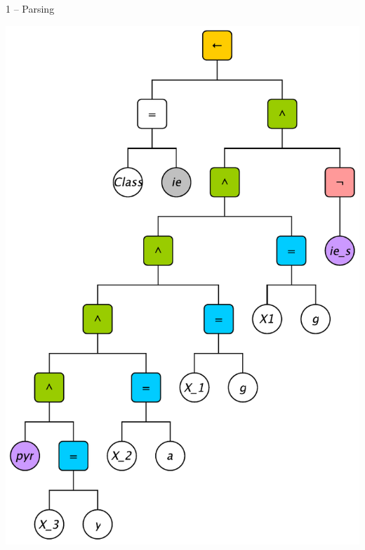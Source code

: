 \documentclass[presentation]{beamer}\mode<presentation>{\usetheme{AMSBolognaFC}}
\begin{document}
\begin{frame}{1 -- Parsing}
\begin{minipage}{0.4\textwidth}
        \includegraphics[width=\linewidth]{figures/ast-ie-1.pdf}
    \end{minipage}%
    
    
\end{frame}
\end{document}
